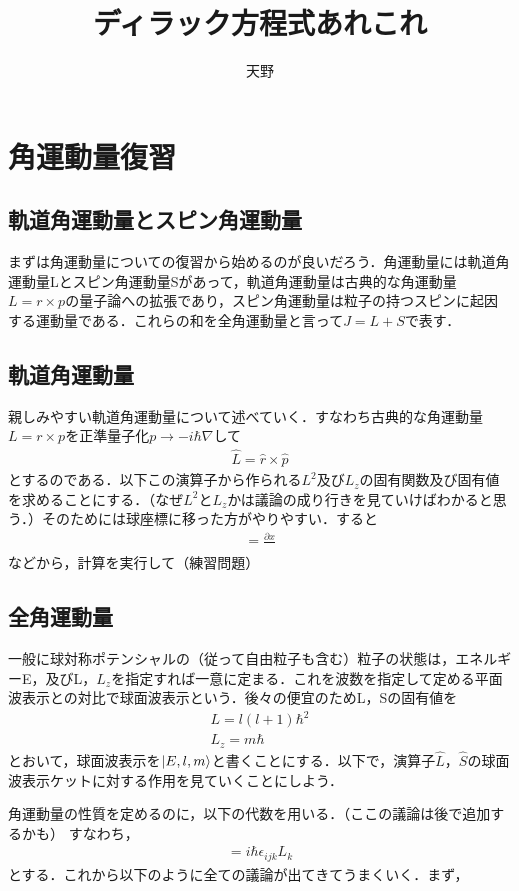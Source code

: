 \documentclass[a4j]{jarticle}
\title{ディラック方程式あれこれ}
\author{天野}
\date{}
\begin{document}
\maketitle
\tableofcontents
 \section{角運動量復習}
 \subsection{軌道角運動量とスピン角運動量}
まずは角運動量についての復習から始めるのが良いだろう．角運動量には軌道角運動量Lとスピン角運動量Sがあって，軌道角運動量は古典的な角運動量$L=r\times p$の量子論への拡張であり，スピン角運動量は粒子の持つスピンに起因する運動量である．これらの和を全角運動量と言って$J=L+S$で表す．

\subsection{軌道角運動量}
親しみやすい軌道角運動量について述べていく．すなわち古典的な角運動量$L=r\times p$を正準量子化$p\to-i\hbar\nabla$して
\begin{align*}
 \hat{L}=\hat{r}\times\hat{p}
\end{align*}
とするのである．以下この演算子から作られる$L^2$及び$L_z$の固有関数及び固有値を求めることにする．（なぜ$L^2$と$L_z$かは議論の成り行きを見ていけばわかると思う．）そのためには球座標に移った方がやりやすい．すると
\begin{align*}
 =\frac{\partial x}{}
\end{align*}
などから，計算を実行して（練習問題）


\subsection{全角運動量}
一般に球対称ポテンシャルの（従って自由粒子も含む）粒子の状態は，エネルギーE，及びL，$L_z$を指定すれば一意に定まる．これを波数を指定して定める平面波表示との対比で球面波表示という．後々の便宜のためL，Sの固有値を
\begin{align*}
 L=l(l+1)\hbar^2\\
 L_z=m\hbar
\end{align*}
とおいて，球面波表示を$\ket{E,l,m}$と書くことにする．以下で，演算子$\hat{L}$，$\hat{S}$の球面波表示ケットに対する作用を見ていくことにしよう．

角運動量の性質を定めるのに，以下の代数を用いる．（ここの議論は後で追加するかも）
すなわち，
\begin{align*}
 [L_i,L_j]=i\hbar\epsilon_{ijk}L_k 	   
\end{align*}
とする．これから以下のように全ての議論が出てきてうまくいく．まず，
\end{document}
